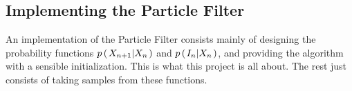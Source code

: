 \subsection*{Implementing the Particle Filter}
An implementation of the Particle Filter consists mainly of designing the probability functions $p\left(\left. X_{n+1} \middle\vert X_n \right.\right)$ and $p\left(\left. I_n \middle\vert X_n \right.\right)$, and providing the algorithm with a sensible initialization. This is what this project is all about. The rest just consists of taking samples from these functions.
